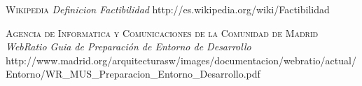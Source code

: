 \begin{thebibliography}{X}
     \textsc{Wikipedia} \textit{Definicion Factibilidad}
     http://es.wikipedia.org/wiki/Factibilidad


      \textsc{Agencia de Informatica y 
     Comunicaciones de la Comunidad de Madrid} \textit{WebRatio Guia de 
     Preparaci\'on de Entorno de Desarrollo}  
     http://www.madrid.org/arquitecturasw/images/documentacion/webratio/actual/
     Entorno/WR\_MUS\_Preparacion\_Entorno\_Desarrollo.pdf
    

\end{thebibliography}

